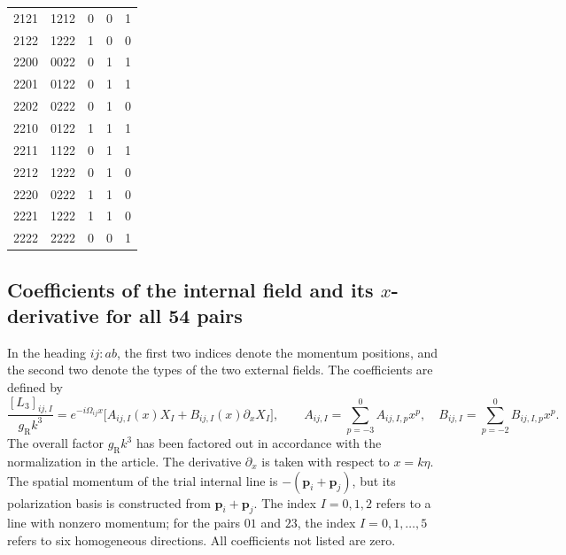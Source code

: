 \documentclass[11pt,a4paper]{article}
\begin{document}
\begin{longtable}{ccccc}
2121 & 1212 & 0 & 0 & 1\\
2122 & 1222 & 1 & 0 & 0\\
2200 & 0022 & 0 & 1 & 1\\
2201 & 0122 & 0 & 1 & 1\\
2202 & 0222 & 0 & 1 & 0\\
2210 & 0122 & 1 & 1 & 1\\
2211 & 1122 & 0 & 1 & 1\\
2212 & 1222 & 0 & 1 & 0\\
2220 & 0222 & 1 & 1 & 0\\
2221 & 1222 & 1 & 1 & 0\\
2222 & 2222 & 0 & 0 & 1\\
\end{longtable}
\subsection{Coefficients of the internal field and its \texorpdfstring{$x$}{x}-derivative for all 54 pairs}
\label{sec:cat-pairs}
In the heading $ij:ab$, the first two indices denote the momentum positions, and the second two denote the types of the two external fields. The coefficients are defined by
\begin{equation}
\frac{[L_3]_{ij,I}}{g_{\mathrm R}k^3}=e^{-i\Omega_{ij}x}\big[A_{ij,I}(x)X_I+B_{ij,I}(x)\partial_xX_I\big],\qquad
A_{ij,I}=\sum_{p=-3}^{0}A_{ij,I,p}x^p,\quad B_{ij,I}=\sum_{p=-2}^{0}B_{ij,I,p}x^p.
\label{eq:cat-pair-polynomials}
\end{equation}
The overall factor $g_{\mathrm R}k^3$ has been factored out in accordance with the normalization in the article. The derivative $\partial_x$ is taken with respect to $x=k\eta$. The spatial momentum of the trial internal line is $-(\mathbf p_i+\mathbf p_j)$, but its polarization basis is constructed from $\mathbf p_i+\mathbf p_j$. The index $I=0,1,2$ refers to a line with nonzero momentum; for the pairs $01$ and $23$, the index $I=0,1,\ldots,5$ refers to six homogeneous directions. All coefficients not listed are zero.
\end{document}
